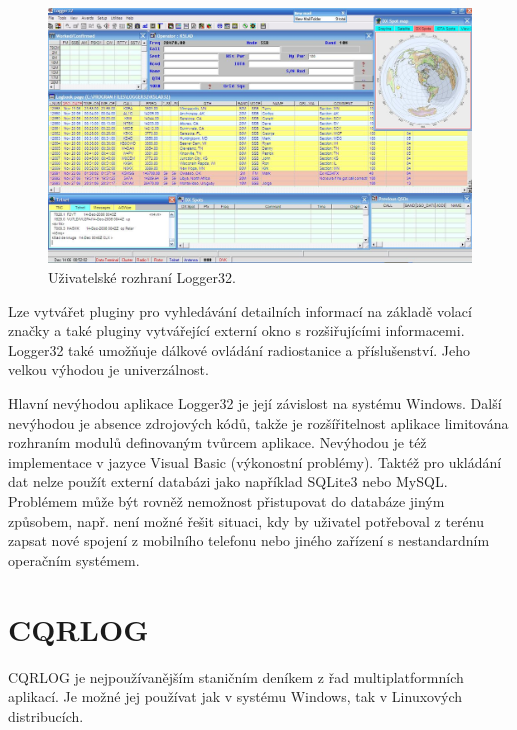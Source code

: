 \begin{figure}[h]
\centering
\includegraphics[trim=0cm 0cm 0cm 0cm, scale=0.33]{fig/logger32}
\caption{Uživatelské rozhraní Logger32.}
\label{fig:logger32}
\end{figure}

Lze vytvářet pluginy pro vyhledávání detailních informací na základě volací značky a také pluginy vytvářející externí okno
s rozšiřujícími informacemi. Logger32 také umožňuje dálkové ovládání
radiostanice a příslušenství. Jeho velkou výhodou je univerzálnost.

Hlavní nevýhodou aplikace Logger32 je její závislost na systému Windows. Další nevýhodou je absence zdrojových kódů, takže je rozšířitelnost aplikace limitována rozhraním modulů definovaným
tvůrcem aplikace. Nevýhodou je též implementace v jazyce Visual Basic
(výkonostní problémy).
Taktéž pro ukládání dat nelze použít externí databázi jako například SQLite3
nebo MySQL. Problémem může být rovněž nemožnost přistupovat do databáze jiným
způsobem, např. není možné řešit situaci, kdy by uživatel potřeboval z terénu 
zapsat %
nové spojení z mobilního telefonu nebo jiného zařízení s nestandardním operačním systémem.

\section{CQRLOG}

CQRLOG je nejpoužívanějším staničním deníkem z řad multiplatformních aplikací. Je možné jej používat jak v systému
Windows, tak v Linuxových distribucích.

